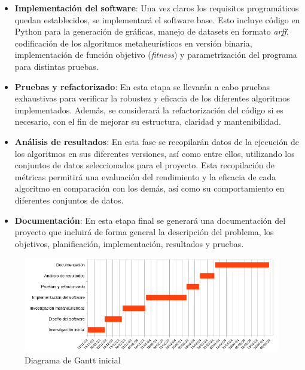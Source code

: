 \begin{itemize}
      \item \textbf{Implementación del software}: Una vez claros los requisitos programáticos quedan establecidos, se implementará el software base. Esto incluye código en Python para la generación de gráficas, manejo de datasets en formato \textit{arff}, codificación de los algoritmos metaheurísticos en versión binaria, implementación de función objetivo (\textit{fitness}) y parametrización del programa para distintas pruebas.
      \item \textbf{Pruebas y refactorizado}: En esta etapa se llevarán a cabo pruebas exhaustivas para verificar la robustez y eficacia de los diferentes algoritmos implementados. Además, se considerará la refactorización del código si es necesario, con el fin de mejorar su estructura, claridad y mantenibilidad. 
      \item \textbf{Análisis de resultados}: En esta fase se recopilarán datos de la ejecución de los algoritmos en sus diferentes versiones, así como entre ellos, utilizando los conjuntos de datos seleccionados para el proyecto. Esta recopilación de métricas permitirá una evaluación del rendimiento y la eficacia de cada algoritmo en comparación con los demás, así como su comportamiento en diferentes conjuntos de datos.
      \item \textbf{Documentación}: En esta etapa final se generará una documentación del proyecto que incluirá de forma general la descripción del problema, los objetivos, planificación, implementación, resultados y pruebas.
\end{itemize}

\begin{figure}[H]
      \begin{center}
      \includegraphics[width=1.2\textwidth]{imagenes/gantt-init.png}
      \end{center}
      \caption{Diagrama de Gantt inicial}
\end{figure}

